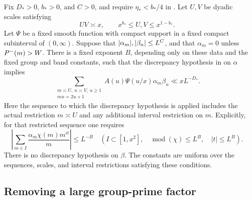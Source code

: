 \begin{theorem}[Type II]\label{thm:typeii}
Fix $D_*>0$, $b_*>0$, and $C>0$, and require
$\eta_*<b_*/4$ in . Let $U,V$ be dyadic
scales satisfying
\[
 UV\asymp x,\qquad x^{b_*}\leq U,V\leq x^{1-b_*}.
\]
Let $\Psi$ be a fixed smooth function with compact support in a fixed
compact subinterval of $(0,\infty)$. Suppose that
$\lvert \alpha_m\rvert,\lvert \beta_n\rvert\leq L^C$, and that $\alpha_m=0$ unless
$P^{-}(m)>W$. There is a fixed exponent $B$, depending only on these
data and the fixed group and band constants, such that the discrepancy
hypothesis in  on $\alpha$ implies
\begin{equation}\label{eq:typeii-bound}
 \sum_{\substack{m\asymp U,\ n\asymp V,\ u\geq1\\mn=2u+1}}
      A(u)\Psi(u/x)\alpha_m\beta_n
       \ll xL^{-D_*}.
\end{equation}
Here the sequence to which the discrepancy hypothesis is applied includes
the actual restriction $m\asymp U$ and any additional interval restriction
on $m$. Explicitly, for that restricted sequence one requires
\[
 \left|\sum_{m\in I}\frac{\alpha_m\chi(m)m^{it}}m\right|
       \leq L^{-B}
 \quad\left(I\subset[1,x^2],\quad
       \operatorname{mod}(\chi)\leq L^B,\quad |t|\leq L^B\right).
\]
There is no discrepancy hypothesis on $\beta$. The constants are uniform
over the sequences, scales, and interval restrictions satisfying these
conditions.
\end{theorem}

\subsection{Removing a large group-prime factor}

